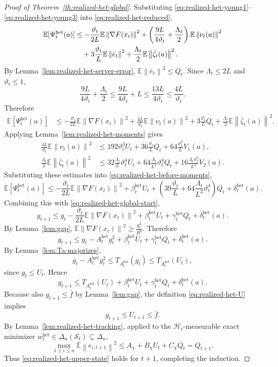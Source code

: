 \documentclass[10pt,a4paper]{amsart}
\newcommand{\EE}{\mathbb E}
\newcommand{\norm}[1]{\left\lVert #1\right\rVert}
\begin{document}
\begin{proof}[Proof of Theorem~\ref{th:realized-het-global}]
Substituting \eqref{eq:realized-het-young1}--\eqref{eq:realized-het-young3} into
\eqref{eq:realized-het-reduced},
\begin{align*}
\EE[\Psi_t^{\mathrm{het}}(a)]
&\le
-\frac{\vartheta_t}{2L}\EE\norm{\nabla F(x_t)}^2
+
\left(
\frac{9L}{4\vartheta_t}
+
\frac{\Lambda_t}{2}
\right)\EE\norm{\nu_t(a)}^2
\notag\\
&\quad+
3\frac{\vartheta_t}{L}\EE\norm{\bar e_t}^2
+
\frac{\Lambda_t}{2}\EE\norm{\bar\zeta_t(a)}^2.
\end{align*}
By Lemma~\ref{lem:realized-het-server-error}, $\EE\norm{\bar e_t}^2\le Q_t$.
Since $\Lambda_t\le 2L$ and $\vartheta_t\le 1$,
\[
\frac{9L}{4\vartheta_t}+\frac{\Lambda_t}{2}
\le
\frac{9L}{4\vartheta_t}+L
\le
\frac{13L}{4\vartheta_t}
\le
\frac{4L}{\vartheta_t}.
\]
Therefore
\begin{align}
\EE[\Psi_t^{\mathrm{het}}(a)]
&\le
-\frac{\vartheta_t}{2L}\EE\norm{\nabla F(x_t)}^2
+
\frac{4L}{\vartheta_t}\EE\norm{\nu_t(a)}^2
+
3\frac{\vartheta_t}{L}Q_t
+
\frac{\Lambda_t}{2}\EE\norm{\bar\zeta_t(a)}^2.
\label{eq:realized-het-before-moments}
\end{align}
Applying Lemma~\ref{lem:realized-het-moments} gives
\begin{align*}
\frac{4L}{\vartheta_t}\EE\norm{\nu_t(a)}^2
&\le
192\vartheta_t^3 U_t
+
36\frac{\vartheta_t}{L}Q_t
+
64\frac{\vartheta_t^3}{L}V_1(a),
\\
\frac{\Lambda_t}{2}\EE\norm{\bar\zeta_t(a)}^2
&\le
32\frac{\Lambda_t}{L}\vartheta_t^4 U_t
+
64\frac{\Lambda_t}{L^2}\vartheta_t^4 Q_t
+
16\frac{\Lambda_t\vartheta_t^2}{L^2}V_2(a).
\end{align*}
Substituting these estimates into \eqref{eq:realized-het-before-moments},
\[
\EE[\Psi_t^{\mathrm{het}}(a)]
\le
-\frac{\vartheta_t}{2L}\EE\norm{\nabla F(x_t)}^2
+
\beta_t^{\mathrm{het}}U_t
+
\left(
39\frac{\vartheta_t}{L}
+
64\frac{\Lambda_t}{L^2}\vartheta_t^4
\right)Q_t
+
\delta_t^{\mathrm{het}}(a).
\]
Combining this with \eqref{eq:realized-het-global-start},
\[
g_{t+1}
\le
g_t
-
\frac{\vartheta_t}{2L}\EE\norm{\nabla F(x_t)}^2
+
\beta_t^{\mathrm{het}}U_t
+
\gamma_t^{\mathrm{het}}Q_t
+
\delta_t^{\mathrm{het}}(a).
\]
By Lemma~\ref{lem:gap}, $\EE\norm{\nabla F(x_t)}^2\ge \frac{g_t^2}{R^2}$.
Therefore
\[
g_{t+1}
\le
g_t-A_t^{\mathrm{het}}g_t^2+\beta_t^{\mathrm{het}}U_t+\gamma_t^{\mathrm{het}}Q_t+\delta_t^{\mathrm{het}}(a).
\]
By Lemma~\ref{lem:Ta-majorizes},
\[
g_t-A_t^{\mathrm{het}}g_t^2
\le
T_{A_t^{\mathrm{het}}}(g_t)
\le
T_{A_t^{\mathrm{het}}}(U_t),
\]
since $g_t\le U_t$. Hence
\[
g_{t+1}
\le
T_{A_t^{\mathrm{het}}}(U_t)
+
\beta_t^{\mathrm{het}}U_t
+
\gamma_t^{\mathrm{het}}Q_t
+
\delta_t^{\mathrm{het}}(a).
\]
Because also $g_{t+1}\le \bar f$ by Lemma~\ref{lem:gap}, the definition \eqref{eq:realized-het-U}
implies
\[
g_{t+1}\le U_{t+1}\le \bar f.
\]
By Lemma~\ref{lem:realized-het-tracking}, applied to the $\mathcal H_t$-measurable exact minimizer
$w_t^{\mathrm{het}}\in\Delta_n(\mathcal S_t)\subseteq\Delta_n$,
\[
\max_{1\le i\le n}\EE\norm{e_{i,t+1}}^2
\le
A_\chi+B_\chi U_t+C_\chi Q_t
=
Q_{t+1}.
\]
Thus \eqref{eq:realized-het-upper-state} holds for $t+1$, completing the induction.
\end{proof}
\end{document}
